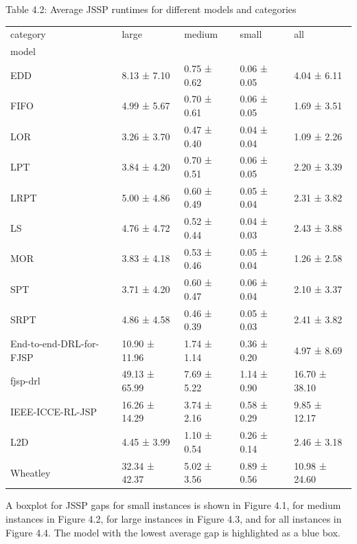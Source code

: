 \begin{table}[H]
    Table 4.2: Average JSSP runtimes for different models and categories\\
    \vspace{1mm}
    \small
    \begin{tabular}{lllll}
        \toprule
        category & large & medium & small & all \\
        model &  &  &  &  \\
        \midrule
        EDD & 8.13 ± 7.10 & 0.75 ± 0.62 & 0.06 ± 0.05 & 4.04 ± 6.11 \\
        FIFO & 4.99 ± 5.67 & 0.70 ± 0.61 & 0.06 ± 0.05 & 1.69 ± 3.51 \\
        LOR & 3.26 ± 3.70 & 0.47 ± 0.40 & 0.04 ± 0.04 & 1.09 ± 2.26 \\
        LPT & 3.84 ± 4.20 & 0.70 ± 0.51 & 0.06 ± 0.05 & 2.20 ± 3.39 \\
        LRPT & 5.00 ± 4.86 & 0.60 ± 0.49 & 0.05 ± 0.04 & 2.31 ± 3.82 \\
        LS & 4.76 ± 4.72 & 0.52 ± 0.44 & 0.04 ± 0.03 & 2.43 ± 3.88 \\
        MOR & 3.83 ± 4.18 & 0.53 ± 0.46 & 0.05 ± 0.04 & 1.26 ± 2.58 \\
        SPT & 3.71 ± 4.20 & 0.60 ± 0.47 & 0.06 ± 0.04 & 2.10 ± 3.37 \\
        SRPT & 4.86 ± 4.58 & 0.46 ± 0.39 & 0.05 ± 0.03 & 2.41 ± 3.82 \\
        End-to-end-DRL-for-FJSP & 10.90 ± 11.96 & 1.74 ± 1.14 & 0.36 ± 0.20 & 4.97 ± 8.69 \\
        fjsp-drl & 49.13 ± 65.99 & 7.69 ± 5.22 & 1.14 ± 0.90 & 16.70 ± 38.10 \\
        IEEE-ICCE-RL-JSP & 16.26 ± 14.29 & 3.74 ± 2.16 & 0.58 ± 0.29 & 9.85 ± 12.17 \\
        L2D & 4.45 ± 3.99 & 1.10 ± 0.54 & 0.26 ± 0.14 & 2.46 ± 3.18 \\
        Wheatley & 32.34 ± 42.37 & 5.02 ± 3.56 & 0.89 ± 0.56 & 10.98 ± 24.60 \\
        \bottomrule
        \end{tabular}        
\end{table}

A boxplot for JSSP gaps for small instances is shown in Figure 4.1, for medium instances in Figure 4.2, for large instances in Figure 4.3, and for all instances in Figure 4.4. The model with the lowest average gap is highlighted as a blue box.

